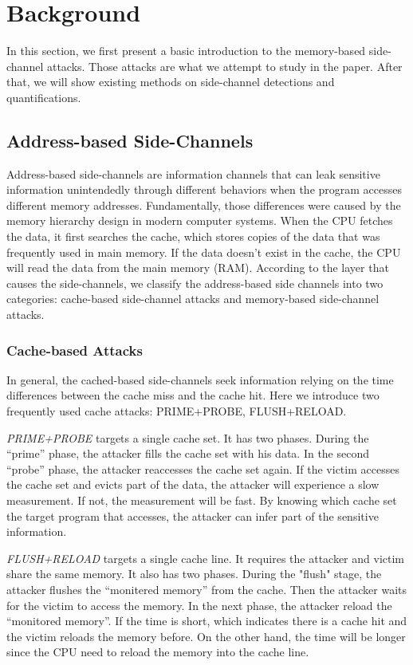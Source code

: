\section{Background}
In this section, we first present a basic introduction to the 
memory-based side-channel attacks. Those attacks 
are what we attempt to study in the paper. After that, we 
will show existing methods on side-channel detections and quantifications.

\subsection{Address-based Side-Channels}
Address-based side-channels are information channels that can 
leak sensitive information unintendedly through different 
behaviors when the program accesses different memory addresses. 
Fundamentally, those differences were caused by the memory hierarchy design 
in modern computer systems. When the CPU fetches the data, it first searches
the cache, which stores copies of the data that was 
frequently used in main memory. If the data doesn't exist in the cache, 
the CPU will read the data from the main memory (RAM). 
According to the layer that causes the side-channels, we classify
the address-based side channels into two categories: 
cache-based side-channel attacks and memory-based side-channel attacks.

\subsubsection{Cache-based Attacks}
In general, the cached-based side-channels seek 
information relying on the time differences between the cache miss
and the cache hit. Here we introduce two frequently used cache attacks:
PRIME+PROBE, FLUSH+RELOAD.

\textit{PRIME+PROBE} targets a single cache set. It has two phases. During the
``prime'' phase, the attacker fills the cache set with his data.
In the second ``probe'' phase, the attacker reaccesses the cache set
again. If the victim accesses the cache set and evicts part of 
the data, the attacker will experience a slow measurement. If not, 
the measurement will be fast. By knowing which cache set the target
program that accesses, the attacker can infer part of
the sensitive information.

\textit{FLUSH+RELOAD} targets a single cache line. 
It requires the attacker and victim share the same memory.
It also has two phases. During the "flush" stage, the attacker 
flushes the ``monitered memory'' from the cache. Then the attacker
waits for the victim to access the memory. In the next phase, the 
attacker reload the ``monitored memory''. If the time is short, which
indicates there is a cache hit and the victim reloads the memory before. 
On the other hand, the time will be longer since the CPU need to reload
the memory into the cache line. 

